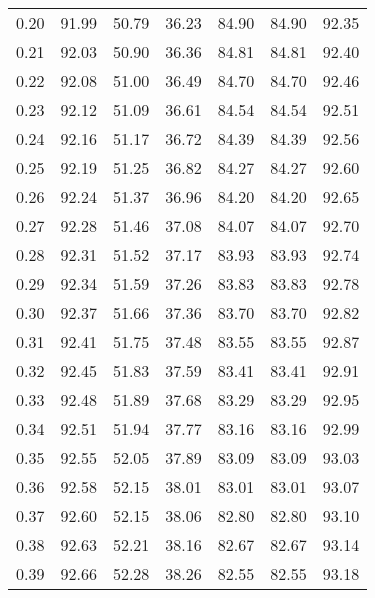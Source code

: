 \begin{tabular}{|c|c|c|c|c|c|c|}
      0.20 &     91.99 &     50.79 &      36.23 &   84.90 &      84.90 &         92.35 \\
      0.21 &     92.03 &     50.90 &      36.36 &   84.81 &      84.81 &         92.40 \\
      0.22 &     92.08 &     51.00 &      36.49 &   84.70 &      84.70 &         92.46 \\
      0.23 &     92.12 &     51.09 &      36.61 &   84.54 &      84.54 &         92.51 \\
      0.24 &     92.16 &     51.17 &      36.72 &   84.39 &      84.39 &         92.56 \\
      0.25 &     92.19 &     51.25 &      36.82 &   84.27 &      84.27 &         92.60 \\
      0.26 &     92.24 &     51.37 &      36.96 &   84.20 &      84.20 &         92.65 \\
      0.27 &     92.28 &     51.46 &      37.08 &   84.07 &      84.07 &         92.70 \\
      0.28 &     92.31 &     51.52 &      37.17 &   83.93 &      83.93 &         92.74 \\
      0.29 &     92.34 &     51.59 &      37.26 &   83.83 &      83.83 &         92.78 \\
      0.30 &     92.37 &     51.66 &      37.36 &   83.70 &      83.70 &         92.82 \\
      0.31 &     92.41 &     51.75 &      37.48 &   83.55 &      83.55 &         92.87 \\
      0.32 &     92.45 &     51.83 &      37.59 &   83.41 &      83.41 &         92.91 \\
      0.33 &     92.48 &     51.89 &      37.68 &   83.29 &      83.29 &         92.95 \\
      0.34 &     92.51 &     51.94 &      37.77 &   83.16 &      83.16 &         92.99 \\
      0.35 &     92.55 &     52.05 &      37.89 &   83.09 &      83.09 &         93.03 \\
      0.36 &     92.58 &     52.15 &      38.01 &   83.01 &      83.01 &         93.07 \\
      0.37 &     92.60 &     52.15 &      38.06 &   82.80 &      82.80 &         93.10 \\
      0.38 &     92.63 &     52.21 &      38.16 &   82.67 &      82.67 &         93.14 \\
      0.39 &     92.66 &     52.28 &      38.26 &   82.55 &      82.55 &         93.18 \\

\end{tabular}
